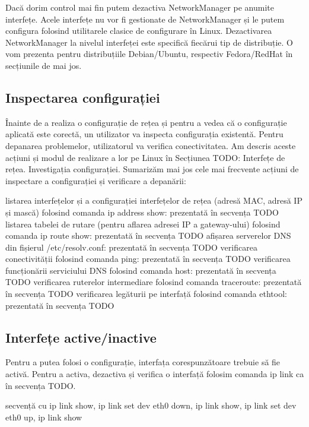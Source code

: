 Dacă dorim control mai fin putem dezactiva NetworkManager pe anumite interfețe. Acele interfețe nu vor fi gestionate de NetworkManager și le putem configura folosind utilitarele clasice de configurare în Linux. Dezactivarea NetworkManager la nivelul interfeței este specifică fiecărui tip de distribuție. O vom prezenta pentru distribuțiile Debian/Ubuntu, respectiv Fedora/RedHat în secțiunile de mai jos.

\subsection{Inspectarea configurației}
\label{sec:net:config-inspect}

Înainte de a realiza o configurație de rețea și pentru a vedea că o configurație aplicată este corectă, un utilizator va inspecta configurația existentă. Pentru depanarea problemelor, utilizatorul va verifica conectivitatea. Am descris aceste acțiuni și modul de realizare a lor pe Linux în Secțiunea TODO: Interfețe de rețea. Investigația configurației. Sumarizăm mai jos cele mai frecvente acțiuni de inspectare a configurației și verificare a depanării:

listarea interfețelor și a configurației interfețelor de rețea (adresă MAC, adresă IP și mască) folosind comanda ip address show: prezentată în secvența TODO
listarea tabelei de rutare (pentru aflarea adresei IP a gateway-ului) folosind comanda ip route show: prezentată în secvența TODO
afișarea serverelor DNS din fișierul /etc/resolv.conf: prezentată în secvența TODO
verificarea conectivității folosind comanda ping: prezentată în secvența TODO
verificarea funcționării serviciului DNS folosind comanda host: prezentată în secvența TODO
verificarea ruterelor intermediare folosind comanda traceroute: prezentată în secvența TODO
verificarea legăturii pe interfață folosind comanda ethtool: prezentată în secvența TODO


\subsection{Interfețe active/inactive}
\label{sec:net:up-down-interfaces}

Pentru a putea folosi o configurație, interfața corespunzătoare trebuie să fie activă. Pentru a activa, dezactiva și verifica o interfață folosim comanda ip link ca în secvența TODO.

secvență cu ip link show, ip link set dev eth0 down, ip link show, ip link set dev eth0 up, ip link show


